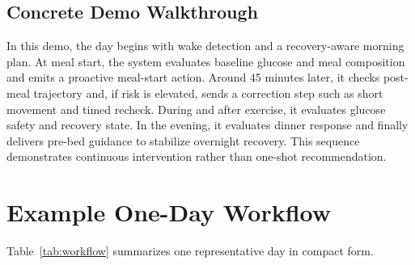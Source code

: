 \documentclass[11pt]{article}
\begin{document}
\subsection{Concrete Demo Walkthrough}
In this demo, the day begins with wake detection and a recovery-aware morning plan. At meal start, the system evaluates baseline glucose and meal composition and emits a proactive meal-start action. Around 45 minutes later, it checks post-meal trajectory and, if risk is elevated, sends a correction step such as short movement and timed recheck. During and after exercise, it evaluates glucose safety and recovery state. In the evening, it evaluates dinner response and finally delivers pre-bed guidance to stabilize overnight recovery. This sequence demonstrates continuous intervention rather than one-shot recommendation.

\section{Example One-Day Workflow}
Table~\ref{tab:workflow} summarizes one representative day in compact form.
\end{document}
